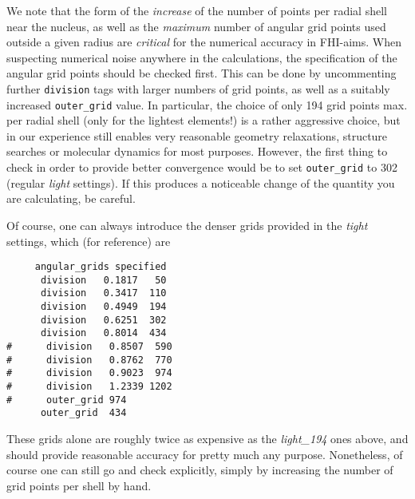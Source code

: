 We note that the form of the \emph{increase} of the number of points per
radial shell near the nucleus, as well as the \emph{maximum} number of angular
grid points used outside a given radius are \emph{critical} for the numerical
accuracy in FHI-aims. When suspecting numerical noise anywhere in the
calculations, the specification of the angular grid points should be checked
first. This can be done by uncommenting further \texttt{division} tags with
larger numbers of grid points, as well as a suitably increased
\texttt{outer\_grid} value. In particular, the choice of only 194 grid points
max. per radial shell (only for the lightest elements!) is a rather aggressive
choice, but in our experience still enables very reasonable geometry
relaxations, structure searches or molecular dynamics for most
purposes. However, the first thing to check in order to provide better
convergence would be to set \texttt{outer\_grid} to 302 (regular
\emph{light} settings). If this produces a
noticeable change of the quantity you are calculating, be careful.

Of course, one can always introduce the denser grids provided in the
\emph{tight} settings, which (for reference) are
\begin{verbatim}
     angular_grids specified
      division   0.1817   50
      division   0.3417  110
      division   0.4949  194
      division   0.6251  302
      division   0.8014  434
#      division   0.8507  590
#      division   0.8762  770
#      division   0.9023  974
#      division   1.2339 1202
#      outer_grid 974
      outer_grid  434
\end{verbatim}
These grids alone are roughly twice as expensive as the \emph{light\_194} ones
above, and should provide reasonable accuracy for pretty much any
purpose. Nonetheless, of course one can still go and check explicitly, simply
by increasing the number of grid points per shell by hand. 




